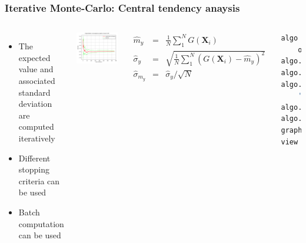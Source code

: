 \documentclass[aspectratio=169]{beamer}
\renewcommand{\footnotesize}{\tiny}
\begin{document}

\begin{frame}[containsverbatim]
\frametitle{Iterative Monte-Carlo: Central tendency anaysis}

\scriptsize{

\begin{columns}

\begin{itemize}
\item The expected value and associated standard deviation are computed iteratively
\item Different stopping criteria can be used 
\item Batch computation can be used
\end{itemize}

    \includegraphics[width=.95\textwidth]{figures/Expectation.png}

    
 \footnotesize
\begin{eqnarray*}
\widehat{m}_y & = & \frac{1}{N}\sum_1^N G(\mathbf{X}_i) \\
\widehat{\sigma}_y  & = & \sqrt{\frac{1}{N}\sum_1^N (G(\mathbf{X}_i)-\hat{m}_y)^2} \\
\widehat{\sigma}_{m_y} & = & \widehat{\sigma}_y / \sqrt{N}
\end{eqnarray*}


\tiny 
\begin{lstlisting}[language=Python, numbers = none]
algo = ot.ExpectationSimulationAlgorithm(
	outputVector)
algo.setMaximumOuterSampling(100000)
algo.setBlockSize(1)
algo.setCoefficientOfVariationCriterionType(
	'MAX')
algo.setMaximumCoefficientOfVariation(0.01)
algo.run()
graph = algo.drawExpectationConvergence()
view = View(graph)

\end{lstlisting}

	
\end{columns}

}

\end{frame}
\end{document}

